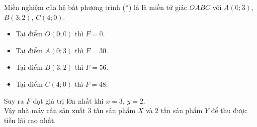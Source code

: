 \begin{bt}
{\begin{center}
	\end{center}
	Miền nghiệm của hệ bất phương trình (*) là là miền tứ giác $OABC$ với $A(0;3)$, $B(3;2)$, $C(4;0)$.
	\begin{itemize}
		\item Tại điểm $O(0;0)$ thì $F=0$. 
		\item 	Tại điểm $A(0;3)$ thì $F=30$.
		\item 	Tại điểm $B(3;2)$ thì $F=56$.
		\item 	Tại điểm $C(4;0)$ thì $F=48$.
	\end{itemize}
	Suy ra $F$ đạt giá trị lớn nhất khi $x=3$, $y=2$.\\
	Vậy nhà máy cần sản xuất $3$ tấn sản phẩm $X$ và $2$ tấn sản phẩm $Y$ để thu được tiền lãi cao nhất.
	}
\end{bt}

